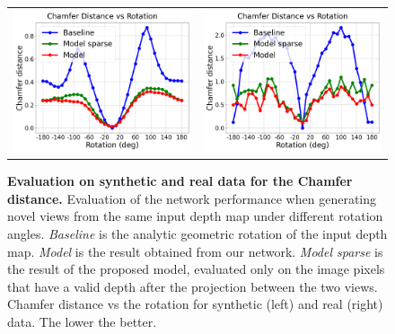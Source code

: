 \begin{figure}
    \centering
    \begin{tabular}{cc}
    \includegraphics[scale=0.2]{main/chapter04/data/plot_chamfer_synth.png} &
    \includegraphics[scale=0.2]{main/chapter04/data/plot_chamfer_real.png}\\
    \end{tabular}
    \caption[Evaluation on synthetic and real data for the Chamfer distance]{{\bf Evaluation on synthetic and real data for the Chamfer distance.} Evaluation of the network performance when generating novel views from the same input depth map under different rotation angles. {\em Baseline} is the analytic geometric rotation of the input depth map. {\em Model} is the result obtained from our network. {\em Model sparse} is the result of the proposed model, evaluated only on the image pixels that have a valid depth after the projection between the two views. Chamfer distance vs the rotation for synthetic (left) and real (right) data. The lower the better.}
    \label{fig_plot_synth_rotations_chamfer}
\end{figure}

